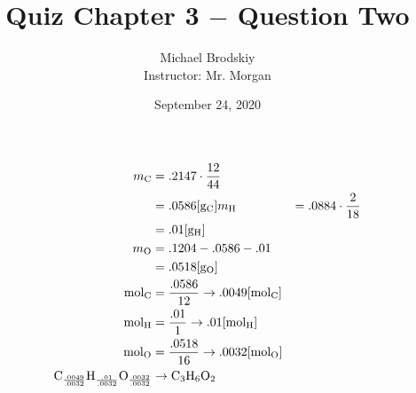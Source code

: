 \documentclass[12pt]{article}
\title{Quiz Chapter 3 $-$ Question Two}
\date{September 24, 2020}
\author{Michael Brodskiy\\ \small Instructor: Mr. Morgan}
\begin{document}
\maketitle

\begin{equation}
  \begin{split}
    m_{\ce{C}}& = .2147\cdot\frac{12}{44}\\
    & = .0586[\si{\gram}_{\ce{C}}]
    m_{\ce{H}} & = .0884\cdot\frac{2}{18} \\
    & = .01[\si{\gram}_{\ce{H}}]\\
    m_{\ce{O}} & = .1204-.0586-.01 \\
    & = .0518[\si{\gram}_{\ce{O}}] \\
    \si{\mole}_{\ce{C}} & = \frac{.0586}{12}\rightarrow.0049[\si{\mole}_{\ce{C}}] \\
    \si{\mole}_{\ce{H}} & = \frac{.01}{1}\rightarrow.01[\si{\mole}_{\ce{H}}] \\
    \si{\mole}_{\ce{O}} & = \frac{.0518}{16}\rightarrow.0032[\si{\mole}_{\ce{O}}] \\
    \ce{C}_{\frac{.0049}{.0032}}\ce{H}_{\frac{.01}{.0032}}\ce{O}_{\frac{.0032}{.0032}} & \rightarrow \ce{C3H6O2}
  \end{split}
  \label{1}
\end{equation}
\end{document}
